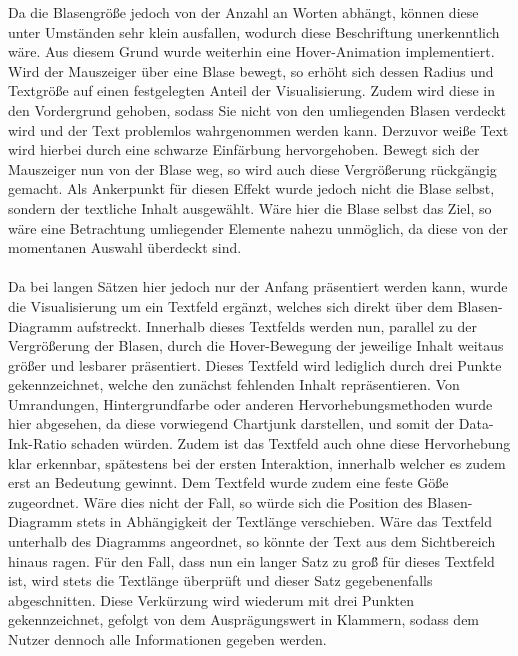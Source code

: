 Da die Blasengr\"o{\ss}e jedoch von der Anzahl an Worten abh\"angt, k\"onnen diese unter Umst\"anden sehr klein ausfallen, wodurch diese Beschriftung unerkenntlich w\"are. Aus diesem Grund wurde weiterhin eine Hover-Animation implementiert. Wird der Mauszeiger \"uber eine Blase bewegt, so erh\"oht sich dessen Radius und Textgr\"o{\ss}e auf einen festgelegten Anteil der Visualisierung. Zudem wird diese in den Vordergrund gehoben, sodass Sie nicht von den umliegenden Blasen verdeckt wird und der Text problemlos wahrgenommen werden kann. Derzuvor wei{\ss}e Text wird hierbei durch eine schwarze Einf\"arbung hervorgehoben. Bewegt sich der Mauszeiger nun von der Blase weg, so wird auch diese Vergr\"o{\ss}erung r\"uckg\"angig gemacht. Als Ankerpunkt f\"ur diesen Effekt wurde jedoch nicht die Blase selbst, sondern der textliche Inhalt ausgew\"ahlt. W\"are hier die Blase selbst das Ziel, so w\"are eine Betrachtung umliegender Elemente nahezu unm\"oglich, da diese von der momentanen Auswahl \"uberdeckt sind.\\
\\
Da bei langen S\"atzen hier jedoch nur der Anfang pr\"asentiert werden kann, wurde die Visualisierung um ein Textfeld erg\"anzt, welches sich direkt \"uber dem Blasen-Diagramm aufstreckt. Innerhalb dieses Textfelds werden nun, parallel zu der Vergr\"o{\ss}erung der Blasen, durch die Hover-Bewegung der jeweilige Inhalt weitaus gr\"o{\ss}er und lesbarer pr\"asentiert. Dieses Textfeld wird lediglich durch drei Punkte gekennzeichnet, welche den zun\"achst fehlenden Inhalt repr\"asentieren. Von Umrandungen, Hintergrundfarbe oder anderen Hervorhebungsmethoden wurde hier abgesehen, da diese vorwiegend Chartjunk darstellen, und somit der Data-Ink-Ratio schaden w\"urden. Zudem ist das Textfeld auch ohne diese Hervorhebung klar erkennbar, sp\"atestens bei der ersten Interaktion, innerhalb welcher es zudem erst an Bedeutung gewinnt. Dem Textfeld wurde zudem eine feste G\"o{\ss}e zugeordnet. W\"are dies nicht der Fall, so w\"urde sich die Position des Blasen-Diagramm stets in Abh\"angigkeit der Textl\"ange verschieben. W\"are das Textfeld unterhalb des Diagramms angeordnet, so k\"onnte der Text aus dem Sichtbereich hinaus ragen. F\"ur den Fall, dass nun ein langer Satz zu gro\"{\ss} f\"ur dieses Textfeld ist, wird stets die Textl\"ange \"uberpr\"uft und dieser Satz gegebenenfalls abgeschnitten. Diese Verk\"urzung wird wiederum mit drei Punkten gekennzeichnet, gefolgt von dem Auspr\"agungswert in Klammern, sodass dem Nutzer dennoch alle Informationen gegeben werden.\\
